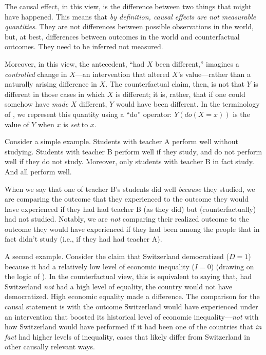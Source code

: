 \documentclass[
  12pt,
]{book}
\begin{document}
The causal effect, in this view, is the difference between two things that might have happened. This means that \emph{by definition, causal effects are not measurable quantities}. They are not differences between possible observations in the world, but, at best, differences between outcomes in the world and counterfactual outcomes. They need to be inferred not measured.

Moreover, in this view, the antecedent, ``had \(X\) been different,'' imagines a \emph{controlled} change in \(X\)---an intervention that altered \(X\)'s value---rather than a naturally arising difference in \(X\). The counterfactual claim, then, is not that \(Y\) is different in those cases in which \(X\) is different; it is, rather, that if one could somehow have \emph{made} \(X\) different, \(Y\) would have been different. In the terminology of \citet{pearl2000causality}, we represent this quantity using a ``do'' operator: \(Y(do(X=x))\) is the value of \(Y\) when \(x\) is \emph{set} to \(x\).

Consider a simple example. Students with teacher A perform well without studying. Students with teacher B perform well if they study, and do not perform well if they do not study. Moreover, only students with teacher B in fact study. And all perform well.

When we say that one of teacher B's students did well \emph{because} they studied, we are comparing the outcome that they experienced to the outcome they would have experienced if they had had teacher B (as they did) but (counterfactually) had not studied. Notably, we are \emph{not} comparing their realized outcome to the outcome they would have experienced if they had been among the people that in fact didn't study (i.e., if they had had teacher A).

A second example. Consider the claim that Switzerland democratized (\(D=1\)) because it had a relatively low level of economic inequality (\(I=0\)) (drawing on the logic of \citet{boix2003democracy}). In the counterfactual view, this is equivalent to saying that, had Switzerland \emph{not} had a high level of equality, the country would not have democratized. High economic equality made a difference. The comparison for the causal statement is with the outcome Switzerland would have experienced under an intervention that boosted its historical level of economic inequality---\emph{not} with how Switzerland would have performed if it had been one of the countries that \emph{in fact} had higher levels of inequality, cases that likely differ from Switzerland in other causally relevant ways.
\end{document}
